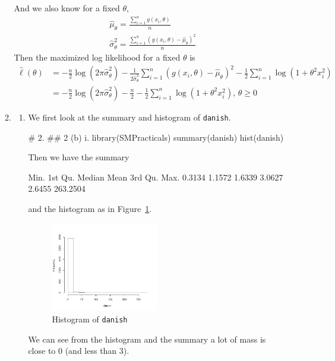 \documentclass{article}
\begin{document}
\begin{enumerate}[leftmargin = 0 em, label = \arabic*., font = \bfseries]
\begin{enumerate}
		And we also know for a fixed $\theta$, 
		\begin{align*}
		& \hat{\mu}_\theta = \frac{\sum_{i=1}^n g(x_i, \theta)}{n}\\
		& \hat{\sigma}_\theta^2 = \frac{\sum_{i=1}^n \left(g(x_i, \theta) - \hat{\mu}_\theta\right)^2}{n}
		\end{align*}
		Then the maximized log likelihood for a fixed $\theta$ is
		\begin{align*}
		\hat{\ell}(\theta) &=  - \frac{n}{2} \log ( 2 \pi \hat{\sigma}_\theta^2) - \frac{1}{2 \hat{\sigma}_\theta^2} \sum_{i=1}^n \left(g(x_i, \theta) - \hat{\mu}_\theta\right)^2 - \frac{1}{2} \sum_{i=1}^n \log(1 + \theta^2 x_i^2)\\
		& = -\frac{n}{2} \log(2 \pi \hat{\sigma}_\theta^2) - \frac{n}{2} - \frac{1}{2} \sum_{i=1}^n \log(1 + \theta^2 x_i^2),\, \theta \geq 0
		\end{align*}
		\item 
	\begin{enumerate}
		\item 
		We first look at the summary and histogram of \verb|danish|.
		\begin{rcode}
# 2.
## 2 (b) i.
library(SMPracticals)
summary(danish)
hist(danish)
		\end{rcode}
		Then we have the summary
		\begin{rcode}
    Min.  1st Qu.   Median     Mean  3rd Qu.     Max. 
  0.3134   1.1572   1.6339   3.0627   2.6455 263.2504 
		\end{rcode}
		\newpage
		and the histogram as in Figure~\ref{danish_hist}.
		\begin{figure}[!htb]
			\centering
			\includegraphics[width = 0.5\textwidth]{danish_hist.jpeg}
			\caption{Histogram of \texttt{danish}}
			\label{danish_hist}
		\end{figure}
		We can see from the histogram and the summary a lot of mass is close to 0 (and less than 3).


\end{enumerate}
\end{enumerate}
\end{enumerate}
\end{document}
